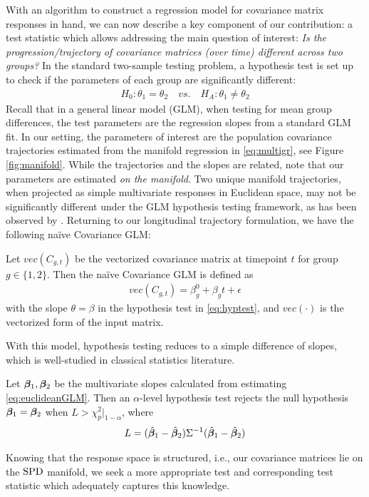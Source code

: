 With an algorithm to construct a regression model for covariance matrix responses in hand, we can now describe a key
component of our contribution: a test statistic which allows addressing the main question of interest: 
{\em Is the progression/trajectory of covariance matrices (over time) different across two groups?} In the standard two-sample testing problem, a hypothesis test is set up
to check if the parameters of each group are significantly different:
\begin{align}\label{eq:hyptest}
H_0: \theta_1 = \theta_2 \quad vs. \quad H_A: \theta_1 \neq \theta_2
\end{align}
Recall that in a general linear model (GLM), when testing for mean group differences, the test parameters are the regression slopes from a standard GLM fit. 
In our setting, the parameters of interest are the population covariance trajectories estimated from the manifold regression in \eqref{eq:multigr}, see Figure \ref{fig:manifold}. 
While the trajectories and the slopes are related, note that our parameters are estimated {\em on the manifold}. 
Two unique manifold trajectories, when projected as simple multivariate responses in Euclidean space, may not be significantly different under the GLM hypothesis testing framework, as has been observed by \cite{du2014geodesic}. Returning to our longitudinal trajectory formulation, we have the following na\"ive Covariance GLM:
\begin{definition} Let $vec(C_{g,t})$ be the vectorized covariance matrix at timepoint $t$ for group $g \in \{1,2\}$. Then the 
na\"ive Covariance GLM is defined as
\begin{align}\label{eq:euclideanGLM}
vec(C_{g,t}) = \beta_g^{0} + \beta_g t + \epsilon
\end{align}
with the slope $\theta = \beta$ in the hypothesis test in \eqref{eq:hyptest}, and $vec(\cdot)$ is the vectorized form of the input matrix. 
\end{definition}
With this model, hypothesis testing reduces to a simple difference of slopes, which is well-studied in classical statistics literature.
\begin{definition}\citep{seber2003linear} \label{eq:euclideanhyptest}
Let $\bm{\beta}_1,\bm{\beta}_2$ be the multivariate slopes calculated from estimating \eqref{eq:euclideanGLM}.
Then an $\alpha$-level hypothesis test rejects the null hypothesis $\bm{\beta}_1 = \bm{\beta}_2$ when $L > \chi^2_{p}|_{1-\alpha}$, where
\begin{align}
L = (\hat{\bm{\beta}}_1 - \hat{\bm{\beta}}_2)\Sigma^{-1}(\hat{\bm{\beta}}_1 - \hat{\bm{\beta}}_2)
\end{align}
\end{definition}
Knowing that the response space is structured, i.e., our covariance matrices lie on the $\text{SPD}$ manifold, we seek a more appropriate test and corresponding test statistic which 
adequately captures this knowledge. 

